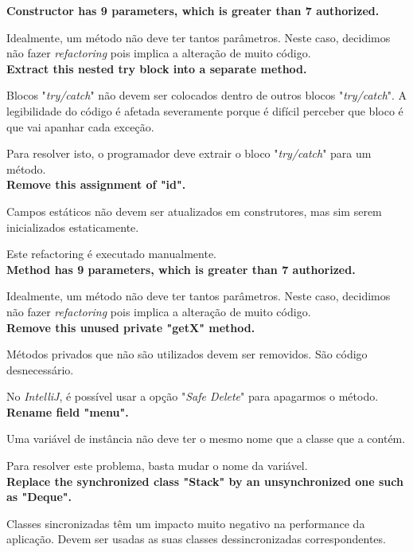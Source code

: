\documentclass[a4paper]{report}
\begin{document}
\begin{itemize}
    \textbf{Constructor has 9 parameters, which is greater than 7 authorized.}
    
    Idealmente, um método não deve ter tantos parâmetros.
    Neste caso, decidimos não fazer \textit{refactoring} pois implica a alteração de muito código.\\
    
    \textbf{Extract this nested try block into a separate method.}
    
    Blocos "\textit{try/catch}" não devem ser colocados dentro de outros blocos "\textit{try/catch}". A legibilidade do código é afetada severamente porque é difícil perceber que bloco é que vai apanhar cada exceção.
    
    Para resolver isto, o programador deve extrair o bloco "\textit{try/catch}" para um método.\\
    
    \textbf{Remove this assignment of "id".}
    
    Campos estáticos não devem ser atualizados em construtores, mas sim serem inicializados estaticamente.
    
    Este refactoring é executado manualmente.\\
    
    \textbf{Method has 9 parameters, which is greater than 7 authorized.}
    
    Idealmente, um método não deve ter tantos parâmetros.
    Neste caso, decidimos não fazer \textit{refactoring} pois implica a alteração de muito código.\\
    
    \textbf{Remove this unused private "getX" method.}
    
    Métodos privados que não são utilizados devem ser removidos. São código desnecessário.
    
    No \textit{IntelliJ}, é possível usar a opção "\textit{Safe Delete}" para apagarmos o método.\\
    
    \textbf{Rename field "menu".}
    
    Uma variável de instância não deve ter o mesmo nome que a classe que a contém.
    
    Para resolver este problema, basta mudar o nome da variável.\\
    
    \textbf{Replace the synchronized class "Stack" by an unsynchronized one such as "Deque".}
    
    Classes sincronizadas têm um impacto muito negativo na performance da aplicação. Devem ser usadas as suas classes dessincronizadas correspondentes.
    

\end{itemize}
\end{document}
